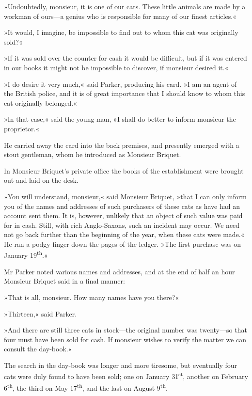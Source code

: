 »Undoubtedly, monsieur, it is one of our cats. These little animals are made by a workman of ours\allowbreak---\allowbreak a genius who is responsible for many of our finest articles.«

»It would, I imagine, be impossible to find out to whom this cat was originally sold?«

»If it was sold over the counter for cash it would be difficult, but if it was entered in our books it might not be impossible to discover, if monsieur desired it.«

»I do desire it very much,« said Parker, producing his card. »I am an agent of the British police, and it is of great importance that I should know to whom this cat originally belonged.«

»In that case,« said the young man, »I shall do better to inform monsieur the proprietor.«

He carried away the card into the back premises, and presently emerged with a stout gentleman, whom he introduced as Monsieur Briquet.

In Monsieur Briquet's private office the books of the establishment were brought out and laid on the desk.

»You will understand, monsieur,« said Monsieur Briquet, »that I can only inform you of the names and addresses of such purchasers of these cats as have had an account sent them. It is, however, unlikely that an object of such value was paid for in cash. Still, with rich Anglo-Saxons, such an incident may occur. We need not go back further than the beginning of the year, when these cats were made.« He ran a podgy finger down the pages of the ledger. »The first purchase was on January 19\textsuperscript{th}.«

Mr Parker noted various names and addresses, and at the end of half an hour Monsieur Briquet said in a final manner:

»That is all, monsieur. How many names have you there?«

»Thirteen,« said Parker.

»And there are still three cats in stock\allowbreak---\allowbreak the original number was twenty\allowbreak---\allowbreak so that four must have been sold for cash. If monsieur wishes to verify the matter we can consult the day-book.«

The search in the day-book was longer and more tiresome, but eventually four cats were duly found to have been sold; one on January 31\textsuperscript{st}, another on February 6\textsuperscript{th}, the third on May 17\textsuperscript{th}, and the last on August 9\textsuperscript{th}.

